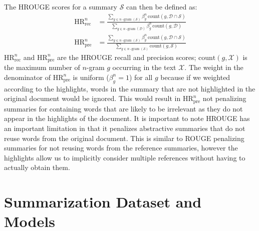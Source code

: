 \documentclass[11pt,a4paper]{article}
\newcommand\hrouge{\textsc{HROUGE}}
\newcommand\rouge{\textsc{ROUGE}}
\begin{document}
The HROUGE scores for a summary $\mathcal{S}$ can then be defined as:
\begin{align}
    \text{HR}_{\mathrm{rec}}^n &= \frac{\displaystyle\sum_{g \in n\operatorname{-gram}(\mathcal{S})} \beta_g^n\, \text{count}(g, \mathcal{D} \cap \mathcal{S})}{\displaystyle\sum_{g \in n\operatorname{-gram}(\mathcal{D})} \beta_g^n\,\text{count}(g, \mathcal{D})} \\
    \text{HR}_{\mathrm{pre}}^n &= \frac{\displaystyle\sum_{g \in n\operatorname{-gram}(\mathcal{S})} \beta_g^n\, \text{count}(g, \mathcal{D} \cap \mathcal{S})}{\displaystyle\sum_{g \in n\operatorname{-gram}(\mathcal{S})} \text{count}(g, \mathcal{S})}
\end{align}
\noindent $\text{HR}_{\mathrm{rec}}^n$ and $\text{HR}_{\mathrm{pre}}^n$ are the HROUGE recall and precision scores; $\text{count}(g, \mathcal{X})$ is the maximum number of $n$-gram $g$ occurring in the text $\mathcal{X}$. The weight in the denominator of $\text{HR}_{\mathrm{pre}}^n$ is uniform ($\beta^n_g = 1$) for all $g$ because if we weighted according to the highlights, words in the summary that are not highlighted in the original document would be ignored. This would result in $\text{HR}_{\mathrm{pre}}^n$ not penalizing summaries for containing words that are likely to be irrelevant as they do not appear in the highlights of the document.
It is important to note \hrouge{} has an important limitation in that it penalizes abstractive summaries that do not reuse words from the original document. This is similar to \rouge{} penalizing summaries for not reusing words from the reference summaries, however the highlights allow us to implicitly consider multiple references without having to actually obtain them.  %

\section{Summarization Dataset and Models}
\label{sec:data-models}
\end{document}
